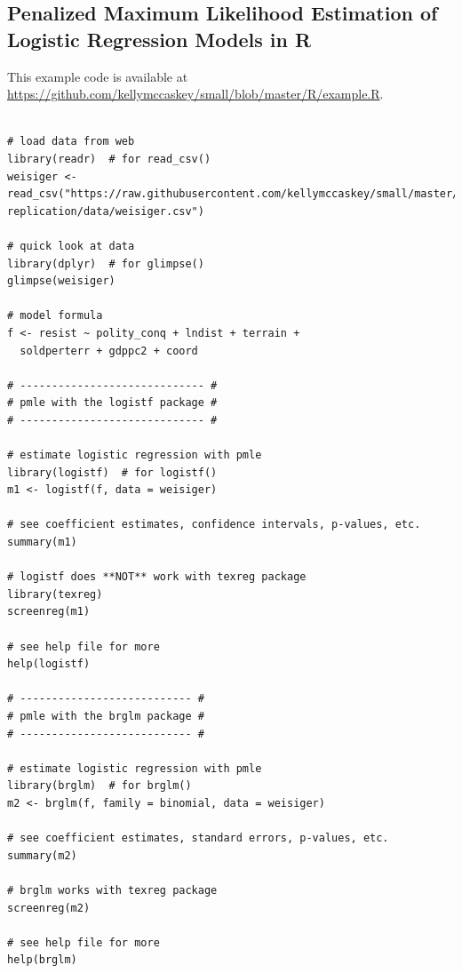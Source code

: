 \documentclass[12pt]{article}
\begin{document}
\begin{appendix}
\section{Penalized Maximum Likelihood Estimation of Logistic Regression Models in R}\label{sec:pmle-in-R}

This example code is available at \href{https://github.com/kellymccaskey/small/blob/master/R/example.R}{https://github.com/kellymccaskey/small/blob/master/R/example.R}.

\begin{verbatim}

# load data from web
library(readr)  # for read_csv()
weisiger <- read_csv("https://raw.githubusercontent.com/kellymccaskey/small/master/weisiger-replication/data/weisiger.csv") 

# quick look at data
library(dplyr)  # for glimpse()
glimpse(weisiger)

# model formula
f <- resist ~ polity_conq + lndist + terrain + 
  soldperterr + gdppc2 + coord

# ----------------------------- #
# pmle with the logistf package #
# ----------------------------- #

# estimate logistic regression with pmle
library(logistf)  # for logistf()
m1 <- logistf(f, data = weisiger)

# see coefficient estimates, confidence intervals, p-values, etc.
summary(m1)

# logistf does **NOT** work with texreg package
library(texreg)
screenreg(m1)

# see help file for more
help(logistf)

# --------------------------- #
# pmle with the brglm package #
# --------------------------- #

# estimate logistic regression with pmle
library(brglm)  # for brglm()
m2 <- brglm(f, family = binomial, data = weisiger)

# see coefficient estimates, standard errors, p-values, etc.
summary(m2)

# brglm works with texreg package
screenreg(m2)

# see help file for more
help(brglm)
\end{verbatim}



\end{appendix}
\end{document}

